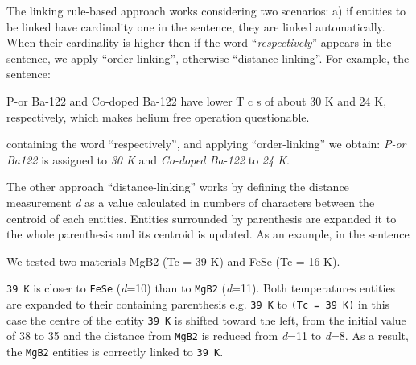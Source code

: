 \documentclass[]{interact}
\theoremstyle{plain}%
\theoremstyle{definition}
\theoremstyle{remark}
\begin{document}
The linking rule-based approach works considering two scenarios: a) if entities to be linked have cardinality one in the sentence, they are linked automatically.
When their cardinality is higher then if the word ``\textit{respectively}'' appears in the sentence, we apply ``order-linking'', otherwise ``distance-linking''.
For example, the sentence:
\begin{displayquote}
    P-or Ba-122  and Co-doped Ba-122 have lower T c s of about 30 K and 24 K, respectively, which makes helium free operation questionable.
\end{displayquote}
containing the word ``respectively'', and applying ``order-linking'' we obtain: \textit{P-or Ba122} is assigned to \textit{30 K} and \textit{Co-doped Ba-122} to \textit{24 K}.


The other approach ``distance-linking'' works by defining the distance measurement \textit{d} as a value calculated in numbers of characters between the centroid of each entities.
Entities surrounded by parenthesis are expanded it to the whole parenthesis and its centroid is updated.
As an example, in the sentence
\begin{displayquote}
    We tested two materials MgB2 (Tc = 39 K) and FeSe (Tc = 16 K).
\end{displayquote}

\texttt{39 K} is closer to \texttt{FeSe} (\textit{d}=10) than to \texttt{MgB2} (\textit{d}=11).
Both temperatures entities are expanded to their containing parenthesis e.g. \texttt{39 K} to \texttt{(Tc = 39 K)} in this case the centre of the entity \texttt{39 K} is shifted toward the left, from the initial value of 38 to 35 and the distance from \texttt{MgB2} is reduced from \textit{d}=11 to \textit{d}=8.
As a result, the \texttt{MgB2} entities is correctly linked to \texttt{39 K}.
\end{document}
